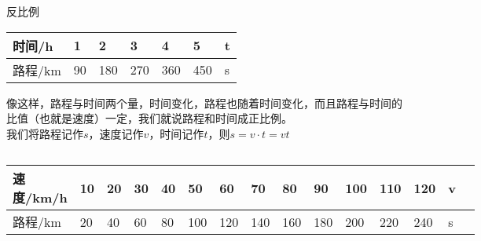 \documentclass[aspectratio=169]{ctexbeamer} %
\begin{document}
\begin{frame}[t]{反比例}
\begin{center}
\begin{tabular}{| l | l | l | l | l | l | l |}
    \hline
    时间/h & 1 & 2 & 3 & 4 & 5 & t \\
    \hline
    路程/km & 90 & 180 & 270 & 360 & 450 & s \\
    \hline
\end{tabular} 
\end{center}
像这样，路程与时间两个量，时间变化，路程也随着时间变化，而且路程与时间的比值（也就是速度）一定，我们就说路程和时间成\alert{正比例}。\\
我们将路程记作$s$，速度记作$v$，时间记作$t$，则$s = v \cdot t = vt$
\begin{columns}


\begin{center}
\begin{tabular}{| l | l | l | l | l | l | l | l | l | l | l | l | l | l | l |}
    \hline
    速度/km/h & 10 & 20 & 30 & 40 & 50 & 60 & 70 & 80 & 90 & 100 & 110 & 120 & v \\
    \hline
    路程/km & 20  & 40 & 60 & 80 & 100 & 120 & 140 & 160 & 180 & 200 & 220 & 240 & s \\
    \hline
\end{tabular} 
\end{center}

\end{columns}
\end{frame}
\end{document}
